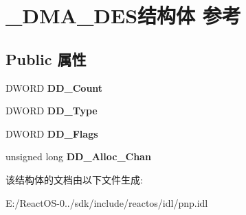 \hypertarget{struct___d_m_a___d_e_s}{}\section{\+\_\+\+D\+M\+A\+\_\+\+D\+E\+S结构体 参考}
\label{struct___d_m_a___d_e_s}
\subsection*{Public 属性}
\begin{DoxyCompactItemize}
\item 
\mbox{\label{struct___d_m_a___d_e_s_afaafe400d7206990b4d7f938c43db70c}} 
D\+W\+O\+RD {\bfseries D\+D\+\_\+\+Count}
\item 
\mbox{\label{struct___d_m_a___d_e_s_aaa615cc71818594c5a717d78c155d916}} 
D\+W\+O\+RD {\bfseries D\+D\+\_\+\+Type}
\item 
\mbox{\label{struct___d_m_a___d_e_s_a7801952c3adaecca562d2a865cc90bad}} 
D\+W\+O\+RD {\bfseries D\+D\+\_\+\+Flags}
\item 
\mbox{\label{struct___d_m_a___d_e_s_a43b76533750510d6cb82413b16f6c433}} 
unsigned long {\bfseries D\+D\+\_\+\+Alloc\+\_\+\+Chan}
\end{DoxyCompactItemize}


该结构体的文档由以下文件生成\+:\begin{DoxyCompactItemize}
\item 
E\+:/\+React\+O\+S-\/0../sdk/include/reactos/idl/pnp.\+idl\end{DoxyCompactItemize}
